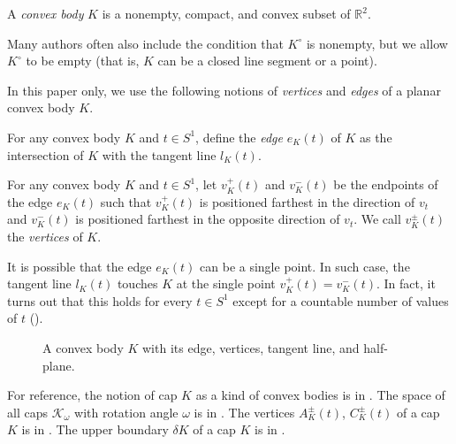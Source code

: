 \begin{definition}

A \emph{convex body} \(K\) is a nonempty, compact, and convex subset of \(\mathbb{R}^2\).

\label{def:convex-body}
\end{definition}

Many authors often also include the condition that \(K^\circ\) is nonempty, but we allow \(K^\circ\) to be empty (that is, \(K\) can be a closed line segment or a point).

In this paper only, we use the following notions of \emph{vertices} and \emph{edges} of a planar convex body \(K\).

\begin{definition}

For any convex body \(K\) and \(t \in S^1\), define the \emph{edge} \(e_K(t)\) of \(K\) as the intersection of \(K\) with the tangent line \(l_K(t)\).

\label{def:convex-body-edge}
\end{definition}

\begin{definition}

For any convex body \(K\) and \(t \in S^1\), let \(v_K^+(t)\) and \(v_K^-(t)\) be the endpoints of the edge \(e_K(t)\) such that \(v_K^+(t)\) is positioned farthest in the direction of \(v_t\) and \(v_K^-(t)\) is positioned farthest in the opposite direction of \(v_t\). We call \(v_K^{\pm}(t)\) the \emph{vertices} of \(K\).

\label{def:convex-body-vertex}
\end{definition}

It is possible that the edge \(e_K(t)\) can be a single point. In such case, the tangent line \(l_K(t)\) touches \(K\) at the single point \(v_K^+(t) = v_K^-(t)\). In fact, it turns out that this holds for every \(t \in S^1\) except for a countable number of values of \(t\) ().

\begin{figure}
\centering

\caption{A convex body \(K\) with its edge, vertices, tangent line, and half-plane.}
\label{fig:convex-body}
\end{figure}

For reference, the notion of cap \(K\) as a kind of convex bodies is in . The space of all caps \(\mathcal{K}_\omega\) with rotation angle \(\omega\) is in . The vertices \(A_K^{\pm}(t)\), \(C_K^{\pm}(t)\) of a cap \(K\) is in . The upper boundary \(\delta K\) of a cap \(K\) is in .